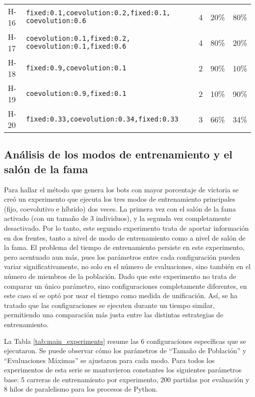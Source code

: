 \begin{longtable}{@{}l p{7cm} c c c@{}}
	H-16        & \texttt{fixed:0.1,coevolution:0.2,fixed:0.1, coevolution:0.6}           & 4             & 20\%             & 80\%              \\
	H-17        & \texttt{coevolution:0.1,fixed:0.2, coevolution:0.1,fixed:0.6}           & 4             & 80\%             & 20\%              \\
	H-18        & \texttt{fixed:0.9,coevolution:0.1}                                      & 2             & 90\%             & 10\%              \\
	H-19        & \texttt{coevolution:0.9,fixed:0.1}                                      & 2             & 10\%             & 90\%              \\
	H-20        & \texttt{fixed:0.33,coevolution:0.34,fixed:0.33}                         & 3             & 66\%             & 34\%              \\
\end{longtable}

\subsection{Análisis de los modos de entrenamiento y el salón de la fama} \label{sec:experimentos_modos_entrenamiento}

Para hallar el método que genera los bots con mayor porcentaje de victoria se creó un experimento que ejecuta los tres modos de entrenamiento principales (fijo, coevolutivo e híbrido) dos veces. La primera vez con el salón de la fama activado (con un tamaño de 3 individuos), y la segunda vez completamente desactivado. Por lo tanto, este segundo experimento trata de aportar información en dos frentes, tanto a nivel de modo de entrenamiento como a nivel de salón de la fama. El problema del tiempo de entrenamiento persiste en este experimento, pero acentuado aun más, pues los parámetros entre cada configuración pueden variar significativamente, no solo en el número de evaluaciones, sino también en el número de miembros de la población. Dado que este experimento no trata de comparar un único parámetro, sino configuraciones completamente diferentes, en este caso sí se optó por usar el tiempo como medida de unificación. Así, se ha tratado que las configuraciones se ejecuten durante un tiempo similar, permitiendo una comparación más justa entre las distintas estrategias de entrenamiento.

La Tabla \ref{tab:main_experiments} resume las 6 configuraciones específicas que se ejecutaron. Se puede observar cómo los parámetros de ``Tamaño de Población'' y ``Evaluaciones Máximas'' se ajustaron para cada modo. Para todos los experimentos de esta serie se mantuvieron constantes los siguientes parámetros base: 5 carreras de entrenamiento por experimento, 200 partidas por evaluación y 8 hilos de paralelismo para los procesos de Python.

